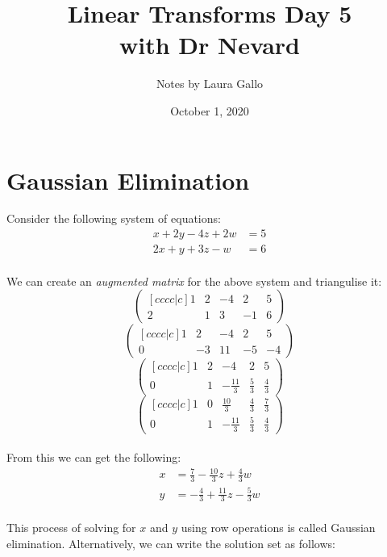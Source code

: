 \documentclass{article}
\title{Linear Transforms Day 5 \\ with Dr Nevard}
\author{Notes by Laura Gallo}
\date{October 1, 2020}
\theoremstyle{definition}
\begin{document}
\maketitle

\section{Gaussian Elimination}
Consider the following system of equations:
\begin{align*}
	x+2y-4z+2w&=5 \\
	2x+y+3z-w&=6
\end{align*}
\\
We can create an \emph{augmented matrix} for the above system and triangulise it:
\begin{equation*}
	\left(
		\begin{matrix}[cccc|c]
			1 & 2 & -4 & 2 & 5 \\
			2 & 1 & 3 & -1 & 6
		\end{matrix}
	\right)
\end{equation*}
\begin{equation*}
	\left(
		\begin{matrix}[cccc|c]
			1 & 2 & -4 & 2 & 5 \\
			0 & -3 & 11 & -5 & -4
		\end{matrix}
	\right)
\end{equation*}
\begin{equation*}
	\left(
		\begin{matrix}[cccc|c]
			1 & 2 & -4 & 2 & 5 \\
			0 & 1 & -\frac{11}{3} & \frac{5}{3} & \frac{4}{3}
		\end{matrix}
	\right)
\end{equation*}
\begin{equation*}
	\left(
		\begin{matrix}[cccc|c]
			1 & 0 & \frac{10}{3} & \frac{4}{3} & \frac{7}{3} \\[1mm]
			0 & 1 & -\frac{11}{3} & \frac{5}{3} & \frac{4}{3}
		\end{matrix}
	\right)
\end{equation*}
\\
From this we can get the following:
\begin{align*}
	x&=\frac{7}{3}-\frac{10}{3}z+\frac{4}{3}w \\
	y&=-\frac{4}{3}+\frac{11}{3}z-\frac{5}{3}w
\end{align*}
\\
This process of solving for $x$ and $y$ using row operations is called Gaussian elimination. Alternatively, we can write the solution set as follows:
\end{document}
